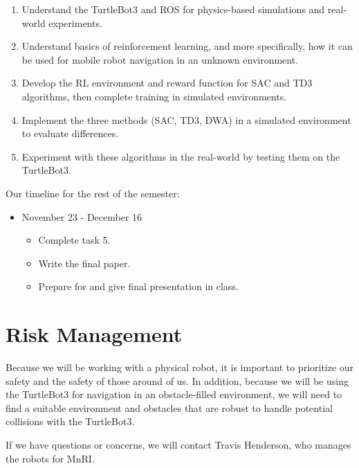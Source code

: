 \documentclass[conference, 11pt]{IEEEtran}
\begin{document}
\begin{enumerate}
    \item Understand the TurtleBot3 and ROS for physics-based simulations and real-world experiments.

    \item Understand basics of reinforcement learning, and more specifically, how it can be used for mobile robot navigation in an unknown environment.

    \item Develop the RL environment and reward function for SAC and TD3 algorithms, then complete training in simulated environments. 

    \item Implement the three methods (SAC, TD3, DWA) in a simulated environment to evaluate differences.

    \item Experiment with these algorithms in the real-world by testing them on the TurtleBot3.
\end{enumerate}

Our timeline for the rest of the semester:
\begin{itemize}
    \item November 23 - December 16

        \begin{itemize}
            \item Complete task 5.

            \item Write the final paper.

            \item Prepare for and give final presentation in class.
        \end{itemize}
    
\end{itemize}

\section{Risk Management}

Because we will be working with a physical robot, it is important to prioritize our safety and the safety of those around of us. In addition, because we will be using the TurtleBot3 for navigation in an obstacle-filled environment, we will need to find a suitable environment and obstacles that are robust to handle potential collisions with the TurtleBot3.

If we have questions or concerns, we will contact Travis Henderson, who manages the robots for MnRI.
\end{document}
